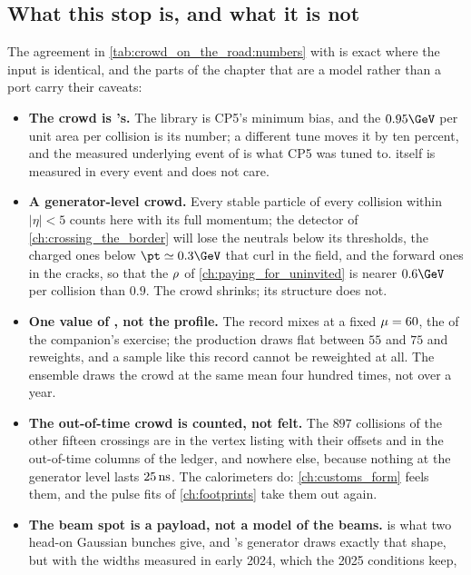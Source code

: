 \subsection{What this stop is, and what it is not}
\label{sec:crowd_on_the_road:caveats}

The agreement in \cref{tab:crowd_on_the_road:numbers} with \FASTJET is
exact where the input is identical, and the parts of the chapter that are
a model rather than a port carry their caveats:
\begin{itemize}
  \item \textbf{The crowd is \PYTHIA's.} The library is CP5's minimum
    bias, and the $0.95\GeV$ per unit area per collision is its number;
    a different tune moves it by ten percent, and the measured underlying
    event of \cite{CMS:2019csb} is what CP5 was tuned to. \rhoPU itself is
    measured in every event and does not care.
  \item \textbf{A generator-level crowd.} Every stable particle of every
    collision within $|\eta|<5$ counts here with its full momentum; the
    detector of \cref{ch:crossing_the_border} will lose the neutrals
    below its thresholds, the charged ones below $\pt\simeq0.3\GeV$ that
    curl in the field, and the forward ones in the cracks, so that the
    $\rho$ of \cref{ch:paying_for_uninvited} is nearer $0.6\GeV$ per
    collision than $0.9$. The crowd shrinks; its structure does not.
  \item \textbf{One value of \mup, not the profile.} The record mixes at
    a fixed $\mu=60$, the  of the companion's exercise; the
    production draws \mutrue flat between $55$ and $75$ and reweights,
    and a sample like this record cannot be reweighted at all. The
    ensemble draws the crowd at the same mean four hundred times, not over
    a year.
  \item \textbf{The out-of-time crowd is counted, not felt.} The $897$
    collisions of the other fifteen crossings are in the vertex listing
    with their offsets and in the out-of-time columns of the ledger, and
    nowhere else, because nothing at the generator level lasts $25\,\mathrm{ns}$.
    The calorimeters do: \cref{ch:customs_form} feels them, and the pulse
    fits of \cref{ch:footprints} take them out again.
  \item \textbf{The beam spot is a payload, not a model of the beams.}
     is what two head-on Gaussian
    bunches give, and \CMSSW's generator draws exactly that shape, but with
    the widths measured in early 2024, which the 2025 conditions keep,

\end{itemize}

